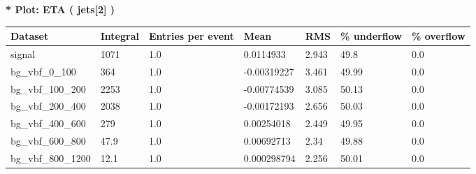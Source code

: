 \documentclass[a4paper, 10pt]{article}
\begin{document}
\textbf{* Plot: ETA ( jets[2] ) }\\
   \begin{table}[H]
  \begin{center}
    \begin{tabular}{|m{23.0mm}|m{23.0mm}|m{18.0mm}|m{19.0mm}|m{19.0mm}|m{19.0mm}|m{19.0mm}|}
      \hline
      {\cellcolor{yellow}         Dataset}& {\cellcolor{yellow}         Integral}& {\cellcolor{yellow}         Entries per event}& {\cellcolor{yellow}         Mean}& {\cellcolor{yellow}         RMS}& {\cellcolor{yellow}         \% underflow}& {\cellcolor{yellow}         \% overflow}\\
      \hline
      {\cellcolor{white}         signal}& {\cellcolor{white}         1071}& {\cellcolor{white}         1.0}& {\cellcolor{white}         0.0114933}& {\cellcolor{white}         2.943}& {\cellcolor{red}         49.8}& {\cellcolor{red}         0.0}\\
      \hline
      {\cellcolor{white}         bg\_vbf\_0\_100}& {\cellcolor{white}         364}& {\cellcolor{white}         1.0}& {\cellcolor{white}         -0.00319227}& {\cellcolor{white}         3.461}& {\cellcolor{red}         49.99}& {\cellcolor{red}         0.0}\\
      \hline
      {\cellcolor{white}         bg\_vbf\_100\_200}& {\cellcolor{white}         2253}& {\cellcolor{white}         1.0}& {\cellcolor{white}         -0.00774539}& {\cellcolor{white}         3.085}& {\cellcolor{red}         50.13}& {\cellcolor{red}         0.0}\\
      \hline
      {\cellcolor{white}         bg\_vbf\_200\_400}& {\cellcolor{white}         2038}& {\cellcolor{white}         1.0}& {\cellcolor{white}         -0.00172193}& {\cellcolor{white}         2.656}& {\cellcolor{red}         50.03}& {\cellcolor{red}         0.0}\\
      \hline
      {\cellcolor{white}         bg\_vbf\_400\_600}& {\cellcolor{white}         279}& {\cellcolor{white}         1.0}& {\cellcolor{white}         0.00254018}& {\cellcolor{white}         2.449}& {\cellcolor{red}         49.95}& {\cellcolor{red}         0.0}\\
      \hline
      {\cellcolor{white}         bg\_vbf\_600\_800}& {\cellcolor{white}         47.9}& {\cellcolor{white}         1.0}& {\cellcolor{white}         0.00692713}& {\cellcolor{white}         2.34}& {\cellcolor{red}         49.88}& {\cellcolor{red}         0.0}\\
      \hline
      {\cellcolor{white}         bg\_vbf\_800\_1200}& {\cellcolor{white}         12.1}& {\cellcolor{white}         1.0}& {\cellcolor{white}         0.000298794}& {\cellcolor{white}         2.256}& {\cellcolor{red}         50.01}& {\cellcolor{red}         0.0}\\

\end{tabular}
\end{center}
\end{table}
\end{document}
